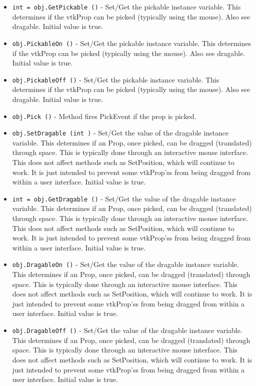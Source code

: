 \begin{itemize}
\item  \verb|int = obj.GetPickable ()| -  Set/Get the pickable instance variable.  This determines if the vtkProp
 can be picked (typically using the mouse). Also see dragable.
 Initial value is true.

\item  \verb|obj.PickableOn ()| -  Set/Get the pickable instance variable.  This determines if the vtkProp
 can be picked (typically using the mouse). Also see dragable.
 Initial value is true.

\item  \verb|obj.PickableOff ()| -  Set/Get the pickable instance variable.  This determines if the vtkProp
 can be picked (typically using the mouse). Also see dragable.
 Initial value is true.

\item  \verb|obj.Pick ()| -  Method fires PickEvent if the prop is picked.

\item  \verb|obj.SetDragable (int )| -  Set/Get the value of the dragable instance variable. This determines if 
 an Prop, once picked, can be dragged (translated) through space.
 This is typically done through an interactive mouse interface.
 This does not affect methods such as SetPosition, which will continue
 to work.  It is just intended to prevent some vtkProp'ss from being
 dragged from within a user interface.
 Initial value is true.

\item  \verb|int = obj.GetDragable ()| -  Set/Get the value of the dragable instance variable. This determines if 
 an Prop, once picked, can be dragged (translated) through space.
 This is typically done through an interactive mouse interface.
 This does not affect methods such as SetPosition, which will continue
 to work.  It is just intended to prevent some vtkProp'ss from being
 dragged from within a user interface.
 Initial value is true.

\item  \verb|obj.DragableOn ()| -  Set/Get the value of the dragable instance variable. This determines if 
 an Prop, once picked, can be dragged (translated) through space.
 This is typically done through an interactive mouse interface.
 This does not affect methods such as SetPosition, which will continue
 to work.  It is just intended to prevent some vtkProp'ss from being
 dragged from within a user interface.
 Initial value is true.

\item  \verb|obj.DragableOff ()| -  Set/Get the value of the dragable instance variable. This determines if 
 an Prop, once picked, can be dragged (translated) through space.
 This is typically done through an interactive mouse interface.
 This does not affect methods such as SetPosition, which will continue
 to work.  It is just intended to prevent some vtkProp'ss from being
 dragged from within a user interface.
 Initial value is true.


\end{itemize}
